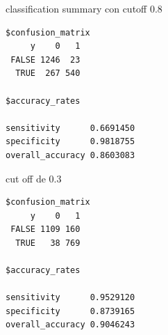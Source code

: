 \documentclass[
  letterpaper,
  DIV=11,
  numbers=noendperiod]{scrartcl}
\begin{document}
classification summary con cutoff 0.8

\begin{verbatim}
$confusion_matrix
     y    0   1
 FALSE 1246  23
  TRUE  267 540

$accuracy_rates
                          
sensitivity      0.6691450
specificity      0.9818755
overall_accuracy 0.8603083
\end{verbatim}

cut off de 0.3

\begin{verbatim}
$confusion_matrix
     y    0   1
 FALSE 1109 160
  TRUE   38 769

$accuracy_rates
                          
sensitivity      0.9529120
specificity      0.8739165
overall_accuracy 0.9046243
\end{verbatim}
\end{document}
